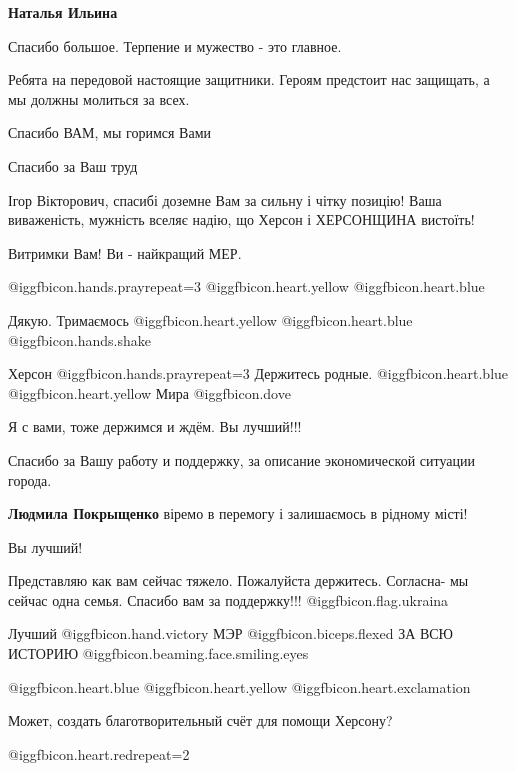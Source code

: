 \begin{itemize}
\textbf{Наталья Ильина} 

Спасибо большое. Терпение и мужество - это главное.

Ребята на передовой настоящие защитники. Героям предстоит нас защищать, а мы
должны молиться за всех.

Спасибо ВАМ, мы горимся Вами

Спасибо за Ваш труд


Ігор Вікторович, спасибі доземне Вам за сильну і чітку позицію! Ваша
виваженість, мужність вселяє надію, що Херсон і ХЕРСОНЩИНА вистоїть!

Витримки Вам! Ви - найкращий МЕР.

 @igg{fbicon.hands.pray}{repeat=3}  @igg{fbicon.heart.yellow}  @igg{fbicon.heart.blue} 

Дякую. Тримаємось @igg{fbicon.heart.yellow}  @igg{fbicon.heart.blue}  @igg{fbicon.hands.shake} 

Херсон @igg{fbicon.hands.pray}{repeat=3} Держитесь родные.  @igg{fbicon.heart.blue}  @igg{fbicon.heart.yellow}  Мира  @igg{fbicon.dove} 

Я с вами, тоже держимся и ждём. Вы лучший!!!

Спасибо за Вашу работу и поддержку, за описание экономической ситуации города.

\textbf{Людмила Покрыщенко} віремо в перемогу і залишаємось в рідному місті!

Вы лучший!


Представляю как вам сейчас тяжело. Пожалуйста держитесь. Согласна- мы сейчас
одна семья. Спасибо вам за поддержку!!! @igg{fbicon.flag.ukraina}

Лучший @igg{fbicon.hand.victory} МЭР  @igg{fbicon.biceps.flexed}  ЗА ВСЮ
ИСТОРИЮ  @igg{fbicon.beaming.face.smiling.eyes} 


 @igg{fbicon.heart.blue}  @igg{fbicon.heart.yellow}  @igg{fbicon.heart.exclamation}

Может, создать благотворительный счёт для помощи Херсону?

@igg{fbicon.heart.red}{repeat=2}


\end{itemize}

